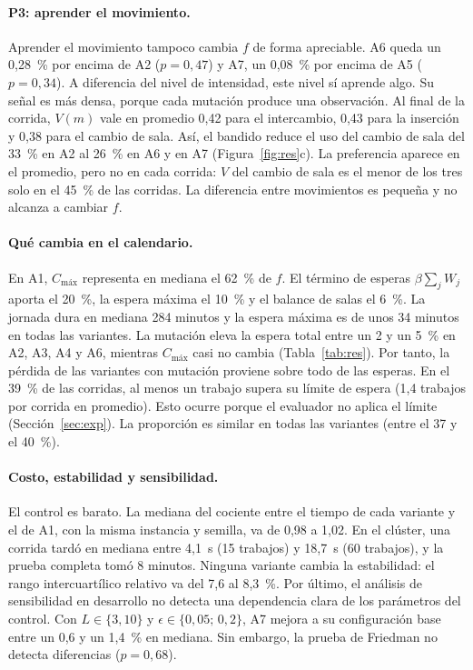 \documentclass[10pt,a4paper]{article}
\newcommand{\Cmax}{C_{\text{máx}}}
\newcommand{\dc}{{,}}%
\begin{document}
\paragraph{P3: aprender el movimiento.}
Aprender el movimiento tampoco cambia $f$ de forma apreciable. A6 queda un 0,28~\% por encima
de A2 ($p=0\dc47$) y A7, un 0,08~\% por encima de A5 ($p=0\dc34$). A diferencia del nivel de
intensidad, este nivel sí aprende algo. Su señal es más densa, porque cada mutación produce una
observación. Al final de la corrida, $V(m)$ vale en promedio 0,42 para el intercambio, 0,43
para la inserción y 0,38 para el cambio de sala. Así, el bandido reduce el uso del cambio de
sala del 33~\% en A2 al 26~\% en A6 y en A7 (Figura~\ref{fig:res}c). La preferencia aparece en
el promedio, pero no en cada corrida: $V$ del cambio de sala es el menor de los tres solo en el
45~\% de las corridas. La diferencia entre movimientos es pequeña y no alcanza a cambiar $f$.

\paragraph{Qué cambia en el calendario.}
En A1, $\Cmax$ representa en mediana el 62~\% de $f$. El término de esperas $\beta\sum_j W_j$
aporta el 20~\%, la espera máxima el 10~\% y el balance de salas el 6~\%. La jornada
dura en mediana 284 minutos y la espera máxima es de unos 34 minutos en todas las variantes.
La mutación eleva la espera total entre un 2 y un 5~\% en A2, A3, A4 y A6, mientras $\Cmax$
casi no cambia (Tabla~\ref{tab:res}). Por tanto, la pérdida de las variantes con mutación
proviene sobre todo de las esperas. En el 39~\% de las corridas, al menos un trabajo supera su
límite de espera (1,4 trabajos por corrida en promedio). Esto ocurre porque el evaluador no
aplica el límite (Sección~\ref{sec:exp}). La proporción es similar en todas las variantes (entre
el 37 y el 40~\%).

\paragraph{Costo, estabilidad y sensibilidad.}
El control es barato. La mediana del cociente entre el tiempo de cada variante y el de A1, con la
misma instancia y semilla, va de 0,98 a 1,02. En el clúster, una corrida tardó en mediana entre
4,1~s (15 trabajos) y 18,7~s (60 trabajos), y la prueba completa tomó 8 minutos. Ninguna
variante cambia la estabilidad: el rango intercuartílico relativo va del 7,6 al 8,3~\%. Por
último, el análisis de sensibilidad en desarrollo no detecta una dependencia clara de los
parámetros del control. Con $L\in\{3,10\}$ y $\epsilon\in\{0\dc05;\,0\dc2\}$, A7 mejora a su
configuración base entre un 0,6 y un 1,4~\% en mediana. Sin embargo, la prueba de Friedman no
detecta diferencias ($p=0\dc68$).
\end{document}

